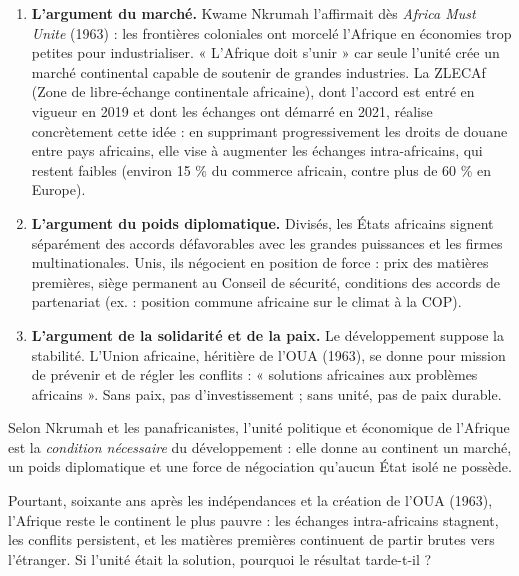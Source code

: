\documentclass[11pt]{article}
\newcommand{\cle}[1]{{\popxbold\color{popdark}#1}}
\newcounter{popsec}
\newcounter{popsub}
\newcommand{\courssub}[1]{%
  \stepcounter{popsub}%
  \par\vspace{9pt}\noindent{\popxbold\fontsize{11.5}{13}\selectfont\color{popink}{\color{poporange}\thepopsec.\thepopsub}\hspace{6pt}#1}\par\nopagebreak\vspace{4pt}
}
\begin{document}
\begin{enumerate}
\item \textbf{L'argument du marché.} Kwame Nkrumah l'affirmait dès \emph{Africa Must Unite} (1963) : les frontières coloniales ont morcelé l'Afrique en économies trop petites pour industrialiser. « L'Afrique doit s'unir » car seule l'unité crée un marché continental capable de soutenir de grandes industries. La \cle{ZLECAf} (Zone de libre-échange continentale africaine), dont l'accord est entré en vigueur en 2019 et dont les échanges ont démarré en 2021, réalise concrètement cette idée : en supprimant progressivement les droits de douane entre pays africains, elle vise à augmenter les échanges intra-africains, qui restent faibles (environ 15 \% du commerce africain, contre plus de 60 \% en Europe).
\item \textbf{L'argument du poids diplomatique.} Divisés, les États africains signent séparément des accords défavorables avec les grandes puissances et les firmes multinationales. Unis, ils négocient en position de force : prix des matières premières, siège permanent au Conseil de sécurité, conditions des accords de partenariat (ex. : position commune africaine sur le climat à la COP).
\item \textbf{L'argument de la solidarité et de la paix.} Le développement suppose la stabilité. L'Union africaine, héritière de l'OUA (1963), se donne pour mission de prévenir et de régler les conflits : « solutions africaines aux problèmes africains ». Sans paix, pas d'investissement ; sans unité, pas de paix durable.
\end{enumerate}

\begin{aretenir}
Selon Nkrumah et les panafricanistes, l'unité politique et économique de l'Afrique est la \emph{condition nécessaire} du développement : elle donne au continent un marché, un poids diplomatique et une force de négociation qu'aucun État isolé ne possède.
\end{aretenir}

\courssub{Antithèse : non, ou pas encore}

\begin{exemplebox}
Pourtant, soixante ans après les indépendances et la création de l'OUA (1963), l'Afrique reste le continent le plus pauvre : les échanges intra-africains stagnent, les conflits persistent, et les matières premières continuent de partir brutes vers l'étranger. Si l'unité était la solution, pourquoi le résultat tarde-t-il ?
\end{exemplebox}
\end{document}
